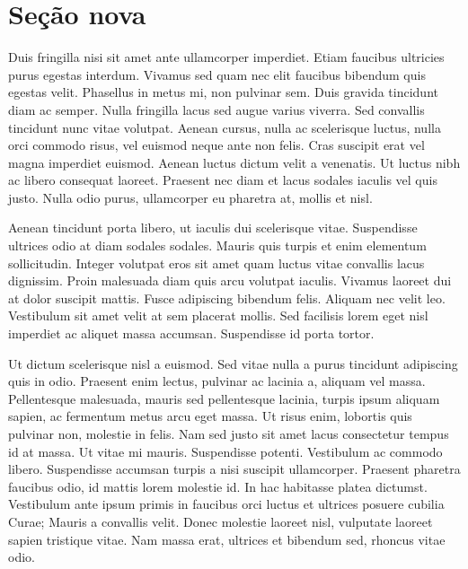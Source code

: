 \section{Se\c{c}\~ao nova}

Duis fringilla nisi sit amet ante ullamcorper imperdiet. Etiam
faucibus ultricies purus egestas interdum. Vivamus sed quam nec elit
faucibus bibendum quis egestas velit. Phasellus in metus mi, non
pulvinar sem. Duis gravida tincidunt diam ac semper. Nulla fringilla
lacus sed augue varius viverra. Sed convallis tincidunt nunc vitae
volutpat. Aenean cursus, nulla ac scelerisque luctus, nulla orci
commodo risus, vel euismod neque ante non felis. Cras suscipit erat
vel magna imperdiet euismod. Aenean luctus dictum velit a
venenatis. Ut luctus nibh ac libero consequat laoreet. Praesent nec
diam et lacus sodales iaculis vel quis justo. Nulla odio purus,
ullamcorper eu pharetra at, mollis et nisl.

Aenean tincidunt porta libero, ut iaculis dui scelerisque
vitae. Suspendisse ultrices odio at diam sodales sodales. Mauris quis
turpis et enim elementum sollicitudin. Integer volutpat eros sit amet
quam luctus vitae convallis lacus dignissim. Proin malesuada diam quis
arcu volutpat iaculis. Vivamus laoreet dui at dolor suscipit
mattis. Fusce adipiscing bibendum felis. Aliquam nec velit
leo. Vestibulum sit amet velit at sem placerat mollis. Sed facilisis
lorem eget nisl imperdiet ac aliquet massa accumsan. Suspendisse id
porta tortor.

Ut dictum scelerisque nisl a euismod. Sed vitae nulla a purus
tincidunt adipiscing quis in odio. Praesent enim lectus, pulvinar ac
lacinia a, aliquam vel massa. Pellentesque malesuada, mauris sed
pellentesque lacinia, turpis ipsum aliquam sapien, ac fermentum metus
arcu eget massa. Ut risus enim, lobortis quis pulvinar non, molestie
in felis. Nam sed justo sit amet lacus consectetur tempus id at
massa. Ut vitae mi mauris. Suspendisse potenti. Vestibulum ac commodo
libero. Suspendisse accumsan turpis a nisi suscipit
ullamcorper. Praesent pharetra faucibus odio, id mattis lorem molestie
id. In hac habitasse platea dictumst. Vestibulum ante ipsum primis in
faucibus orci luctus et ultrices posuere cubilia Curae; Mauris a
convallis velit. Donec molestie laoreet nisl, vulputate laoreet sapien
tristique vitae. Nam massa erat, ultrices et bibendum sed, rhoncus
vitae odio.

